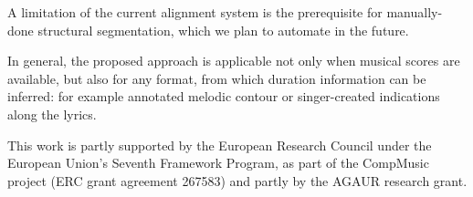 \documentclass{article}
\begin{document}
A limitation of the current alignment system is the prerequisite for
manually-done structural segmentation, which we plan to automate in
the future. 

In general, the proposed approach is applicable not only when musical
scores are available, but also for any format, from which duration
information can be inferred: for example annotated melodic contour
or singer-created indications along the lyrics.


%
\begin{acknowledgments}
This work is partly supported by the European Research Council under the European Union’s Seventh Framework Program, as part of the CompMusic project (ERC grant agreement 267583) and partly by the AGAUR research grant.
\end{acknowledgments} 




\end{document}
